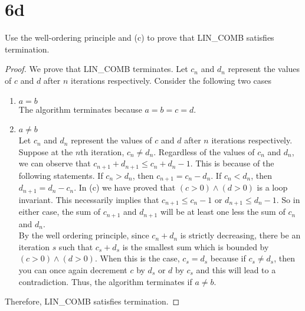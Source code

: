 \documentclass[11pt]{scrartcl}
\begin{document}
\section{6d}
Use the well-ordering principle and (c) to prove that LIN\_COMB satisfies
termination.
\begin{proof}
	We prove that LIN\_COMB terminates. Let $c_n$ and $d_n$ represent the values of $c$ and $d$ after $n$ iterations
	respectively. Consider the following two cases
	\begin{enumerate}[label=\arabic*.]
		\item{
		      $a = b$\\
		      \hspace*{10mm}The algorithm terminates because $a = b = c = d$.
		      }
		\item{
		      $a \neq b$\\
		      \hspace*{10mm}Let $c_n$ and $d_n$ represent the values of $c$ and $d$ after $n$ iterations
		      respectively. Suppose at the $n$th iteration, $c_n \neq d_n$.
		      Regardless of the values of $c_n$ and $d_n$, we can observe that $c_{n+1} + d_{n+1} \leq c_n + d_n - 1$.
		      This is because of the following statements. If $c_n > d_n$, then $c_{n+1} = c_n - d_n$.
		      If $c_n < d_n$, then $d_{n+1} = d_n - c_n$.
		      In (c) we have proved that $(c > 0) \land (d > 0)$ is a loop invariant.
		      This necessarily implies that $c_{n+1} \leq c_n - 1$ or $d_{n+1} \leq d_n - 1$. So in either case,
		      the sum of $c_{n+1}$ and $d_{n+1}$ will be at least one less the sum of $c_n$ and $d_n$.\\
			  \hspace*{10mm}By the well ordering
			  principle, since $c_n + d_n$ is strictly decreasing, there be an iteration $s$ such that 
			  $c_s + d_s$ is the smallest sum which is bounded by $(c > 0) \land (d > 0)$. 
			  When this is the case, $c_s = d_s$ because if $c_s \neq d_s$,
			  then you can once again decrement $c$ by $d_s$ or $d$ by $c_s$ and this will lead to a contradiction.
			  Thus, the algorithm terminates if $a \neq b$.
		      }
	\end{enumerate}
	Therefore, LIN\_COMB satisfies termination.

\end{proof}
\end{document}
